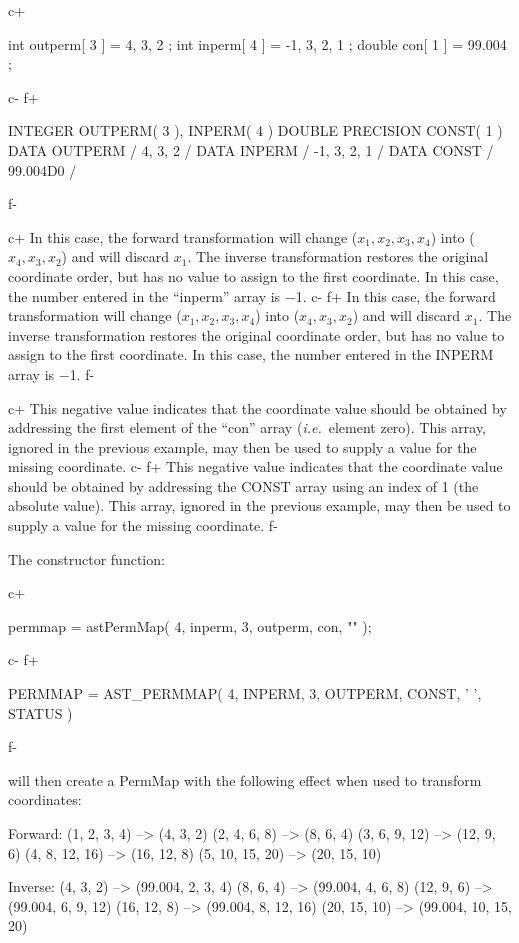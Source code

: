\documentclass[twoside,11pt]{starlink}
\begin{document}
c+
\small
\begin{terminalv}
int outperm[ 3 ] = { 4, 3, 2 };
int inperm[ 4 ] = { -1, 3, 2, 1 };
double con[ 1 ] = { 99.004 };
\end{terminalv}
\normalsize
c-
f+
\small
\begin{terminalv}
      INTEGER OUTPERM( 3 ), INPERM( 4 )
      DOUBLE PRECISION CONST( 1 )
      DATA OUTPERM / 4, 3, 2 /
      DATA INPERM / -1, 3, 2, 1 /
      DATA CONST / 99.004D0 /
\end{terminalv}
\normalsize
f-

c+
In this case, the forward transformation will change
($x_1,x_2,x_3,x_4$) into ($x_4,x_3,x_2$) and will discard $x_1$. The
inverse transformation restores the original coordinate order, but has
no value to assign to the first coordinate. In this case, the number
entered in the ``inperm'' array is $-$1.
c-
f+
In this case, the forward transformation will change
($x_1,x_2,x_3,x_4$) into ($x_4,x_3,x_2$) and will discard $x_1$. The
inverse transformation restores the original coordinate order, but has
no value to assign to the first coordinate. In this case, the number
entered in the INPERM array is $-$1.
f-

c+
This negative value indicates that the coordinate value should be
obtained by addressing the first element of the ``con'' array
(\emph{i.e.}\ element zero). This array, ignored in the previous
example, may then be used to supply a value for the missing
coordinate.
c-
f+
This negative value indicates that the coordinate value should be
obtained by addressing the CONST array using an index of 1 (the
absolute value). This array, ignored in the previous example, may then
be used to supply a value for the missing coordinate.
f-

The constructor function:

c+
\small
\begin{terminalv}
permmap = astPermMap( 4, inperm, 3, outperm, con, "" );
\end{terminalv}
\normalsize
c-
f+
\small
\begin{terminalv}
      PERMMAP = AST_PERMMAP( 4, INPERM, 3, OUTPERM, CONST, ' ', STATUS )
\end{terminalv}
\normalsize
f-

will then create a PermMap with the following effect when used to
transform coordinates:

\begin{terminalv}
Forward:
   (1, 2, 3, 4) --> (4, 3, 2)
   (2, 4, 6, 8) --> (8, 6, 4)
   (3, 6, 9, 12) --> (12, 9, 6)
   (4, 8, 12, 16) --> (16, 12, 8)
   (5, 10, 15, 20) --> (20, 15, 10)

Inverse:
   (4, 3, 2) --> (99.004, 2, 3, 4)
   (8, 6, 4) --> (99.004, 4, 6, 8)
   (12, 9, 6) --> (99.004, 6, 9, 12)
   (16, 12, 8) --> (99.004, 8, 12, 16)
   (20, 15, 10) --> (99.004, 10, 15, 20)
\end{terminalv}
\end{document}

